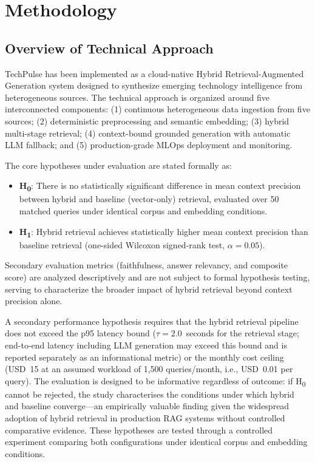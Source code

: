 \chapter{Methodology}

\section{Overview of Technical Approach}
\label{sec:method_overview}

TechPulse has been implemented as a cloud-native Hybrid Retrieval-Augmented Generation system designed to synthesize emerging technology intelligence from heterogeneous sources. The technical approach is organized around five interconnected components: (1) continuous heterogeneous data ingestion from five sources; (2) deterministic preprocessing and semantic embedding; (3) hybrid multi-stage retrieval; (4) context-bound grounded generation with automatic LLM fallback; and (5) production-grade MLOps deployment and monitoring.

The core hypotheses under evaluation are stated formally as:

\begin{itemize}[leftmargin=0.5in]
  \item \textbf{H\textsubscript{0}}: There is no statistically significant difference in mean context precision between hybrid and baseline (vector-only) retrieval, evaluated over 50 matched queries under identical corpus and embedding conditions.
  \item \textbf{H\textsubscript{1}}: Hybrid retrieval achieves statistically higher mean context precision than baseline retrieval (one-sided Wilcoxon signed-rank test, $\alpha = 0.05$).
\end{itemize}

\noindent Secondary evaluation metrics (faithfulness, answer relevancy, and composite score) are analyzed descriptively and are not subject to formal hypothesis testing, serving to characterize the broader impact of hybrid retrieval beyond context precision alone.

A secondary performance hypothesis requires that the hybrid retrieval pipeline does not exceed the p95 latency bound ($\tau = 2.0$~seconds for the retrieval stage; end-to-end latency including LLM generation may exceed this bound and is reported separately as an informational metric) or the monthly cost ceiling (USD~15 at an assumed workload of 1,500 queries/month, i.e., USD~0.01 per query). The evaluation is designed to be informative regardless of outcome: if H\textsubscript{0} cannot be rejected, the study characterises the conditions under which hybrid and baseline converge---an empirically valuable finding given the widespread adoption of hybrid retrieval in production RAG systems without controlled comparative evidence. These hypotheses are tested through a controlled experiment comparing both configurations under identical corpus and embedding conditions.

